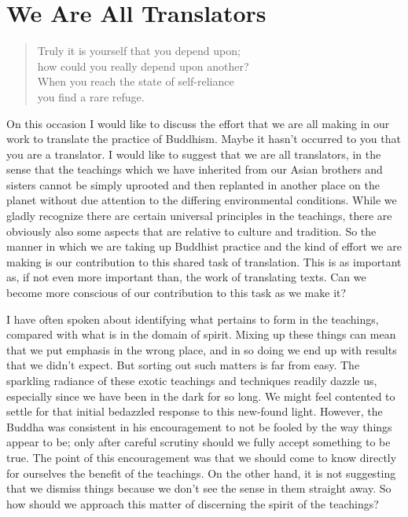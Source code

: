\chapter{We Are All Translators}

\begin{quote}
Truly it is yourself that you depend upon;\\
how could you really depend upon another?\\
When you reach the state of self-reliance\\
you find a rare refuge.

\end{quote}

On this occasion I would like to discuss the effort that we are all
making in our work to translate the practice of Buddhism. Maybe it
hasn't occurred to you that you are a translator. I would like to
suggest that we are all translators, in the sense that the teachings
which we have inherited from our Asian brothers and sisters cannot be
simply uprooted and then replanted in another place on the planet
without due attention to the differing environmental conditions. While
we gladly recognize there are certain universal principles in the
teachings, there are obviously also some aspects that are relative to
culture and tradition. So the manner in which we are taking up Buddhist
practice and the kind of effort we are making is our contribution to
this shared task of translation. This is as important as, if not even
more important than, the work of translating texts. Can we become more
conscious of our contribution to this task as we make it?

I have often spoken about identifying what pertains to form in the
teachings, compared with what is in the domain of spirit. Mixing up
these things can mean that we put emphasis in the wrong place, and in so
doing we end up with results that we didn't expect. But sorting out such
matters is far from easy. The sparkling radiance of these exotic
teachings and techniques readily dazzle us, especially since we have
been in the dark for so long. We might feel contented to settle for that
initial bedazzled response to this new-found light. However, the Buddha
was consistent in his encouragement to not be fooled by the way things
appear to be; only after careful scrutiny should we fully accept
something to be true. The point of this encouragement was that we should
come to know directly for ourselves the benefit of the teachings. On the
other hand, it is not suggesting that we dismiss things because we don't
see the sense in them straight away. So how should we approach this
matter of discerning the spirit of the teachings?

